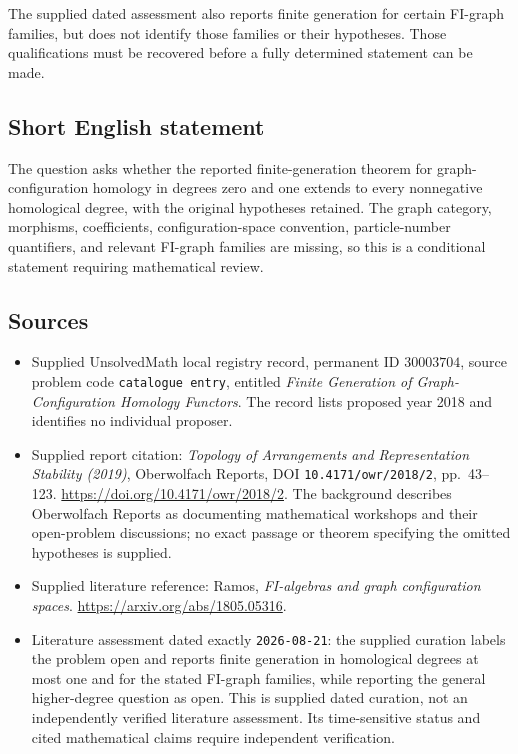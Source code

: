 \documentclass[11pt]{article}
\begin{document}
The supplied dated assessment also reports finite generation for certain FI-graph families, but does not identify those families or their hypotheses. Those qualifications must be recovered before a fully determined statement can be made.
\subsection{Short English statement}
The question asks whether the reported finite-generation theorem for graph-configuration homology in degrees zero and one extends to every nonnegative homological degree, with the original hypotheses retained. The graph category, morphisms, coefficients, configuration-space convention, particle-number quantifiers, and relevant FI-graph families are missing, so this is a conditional statement requiring mathematical review.
\subsection{Sources}
\begin{itemize}
\item Supplied UnsolvedMath local registry record, permanent ID \(30003704\), source problem code \texttt{catalogue entry}, entitled \emph{Finite Generation of Graph-Configuration Homology Functors}. The record lists proposed year 2018 and identifies no individual proposer.
\item Supplied report citation: \emph{Topology of Arrangements and Representation Stability (2019)}, Oberwolfach Reports, DOI \texttt{10.4171/owr/2018/2}, pp.\ 43--123. \url{https://doi.org/10.4171/owr/2018/2}. The background describes Oberwolfach Reports as documenting mathematical workshops and their open-problem discussions; no exact passage or theorem specifying the omitted hypotheses is supplied.
\item Supplied literature reference: Ramos, \emph{FI-algebras and graph configuration spaces}. \url{https://arxiv.org/abs/1805.05316}.
\item Literature assessment dated exactly \texttt{2026-08-21}: the supplied curation labels the problem open and reports finite generation in homological degrees at most one and for the stated FI-graph families, while reporting the general higher-degree question as open. This is supplied dated curation, not an independently verified literature assessment. Its time-sensitive status and cited mathematical claims require independent verification.
\end{itemize}
\end{document}
